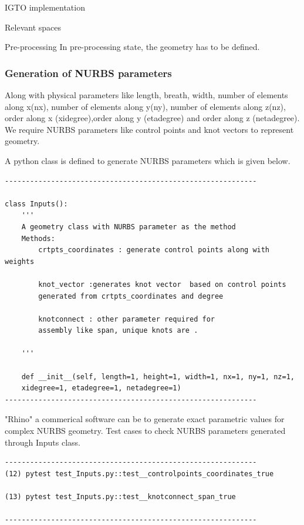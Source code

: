 \documentclass[a4paper,12pt,times]{article}
\begin{document}
\begin{section}{IGTO implementation}
\begin{subsection}{Relevant spaces}
\begin{enumerate}
\end{enumerate}

\end{subsection}

\begin{subsection}{Pre-processing}
In pre-processing state, the geometry has to be defined.

\subsubsection{Generation of NURBS parameters}
Along with physical parameters like length, breath, width, number of elements along x(nx), number of elements along y(ny), number of elements along z(nz), order along x (xidegree),order along y (etadegree) and order along z (netadegree). We require NURBS parameters like control points and knot vectors to represent geometry. 

A python class is defined to generate NURBS parameters which is given below.
\begin{verbatim}
------------------------------------------------------------

class Inputs():
    '''
    A geometry class with NURBS parameter as the method
    Methods:
        crtpts_coordinates : generate control points along with weights 

        knot_vector :generates knot vector  based on control points 
        generated from crtpts_coordinates and degree

        knotconnect : other parameter required for 
        assembly like span, unique knots are .
        
    '''

    def __init__(self, length=1, height=1, width=1, nx=1, ny=1, nz=1, 
    xidegree=1, etadegree=1, netadegree=1)
------------------------------------------------------------

\end{verbatim}
 "Rhino" a commerical software can be to generate exact parametric values for complex NURBS geometry.
Test cases to check NURBS parameters generated through Inputs class.
\begin{verbatim}
------------------------------------------------------------
(12) pytest test_Inputs.py::test__controlpoints_coordinates_true

(13) pytest test_Inputs.py::test__knotconnect_span_true

------------------------------------------------------------
\end{verbatim}


\end{subsection}
\end{section}
\end{document}
